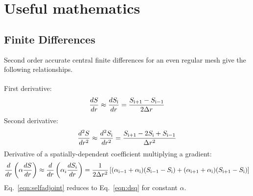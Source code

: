 \section{Useful mathematics}
\subsection{Finite Differences}
Second order accurate central finite differences for an even regular mesh give the following relationships.\\ \\ First derivative:
\begin{equation}
\frac{dS}{dr} \approx \frac{dS_{\rm{i}}}{dr} = \frac{S_{\rm{i+1}}-S_{\rm{i-1}}}{2 \Delta r}
\end{equation}
Second derivative:
\begin{equation}
\label{eqn:dsq}
\frac{d^2S}{dr^2} \approx \frac{d^2S_{\rm{i}}}{dr^2} = \frac{S_{\rm{i+1}}-2S_{\rm{i}}+S_{\rm{i-1}}}{\Delta r^2}
\end{equation}
Derivative of a spatially-dependent coefficient multiplying a gradient:
\begin{equation}
\label{eqn:selfadjoint}
\frac{d}{dr} \left( \alpha \frac{dS}{dr}\right) \approx \frac{d}{dr} \left( \alpha_i \frac{dS_i}{dr} \right) = \frac{1}{2 \Delta r^2} \left[ (\alpha_{\rm{i-1}}+\alpha_{\rm{i}})(S_{\rm{i-1}}-S_{\rm{i}}) + (\alpha_{\rm{i+1}}+\alpha_{\rm{i}})(S_{\rm{i+1}}-S_{\rm{i}})  \right]
\end{equation}
Eq.~\ref{eqn:selfadjoint} reduces to Eq.~\ref{eqn:dsq} for constant $\alpha$.